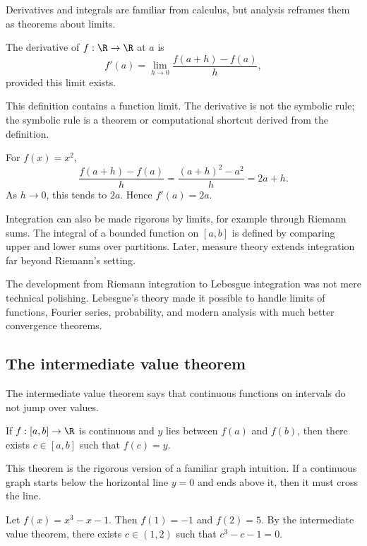 Derivatives and integrals are familiar from calculus, but analysis reframes
them as theorems about limits.

\begin{definition}
The derivative of $f:\R\to\R$ at $a$ is
\[
f'(a)=\lim_{h\to0}\frac{f(a+h)-f(a)}{h},
\]
provided this limit exists.
\end{definition}

This definition contains a function limit. The derivative is not the symbolic
rule; the symbolic rule is a theorem or computational shortcut derived from the
definition.

\begin{example}
For $f(x)=x^2$,
\[
\frac{f(a+h)-f(a)}{h}=\frac{(a+h)^2-a^2}{h}=2a+h.
\]
As $h\to0$, this tends to $2a$. Hence $f'(a)=2a$.
\end{example}

Integration can also be made rigorous by limits, for example through Riemann
sums. The integral of a bounded function on $[a,b]$ is defined by comparing
upper and lower sums over partitions. Later, measure theory extends integration
far beyond Riemann's setting.

\begin{historybox}
The development from Riemann integration to Lebesgue integration was not mere
technical polishing. Lebesgue's theory made it possible to handle limits of
functions, Fourier series, probability, and modern analysis with much better
convergence theorems.
\end{historybox}

\subsection{The intermediate value theorem}

The intermediate value theorem says that continuous functions on intervals do
not jump over values.

\begin{theorem}
If $f:[a,b]\to\R$ is continuous and $y$ lies between $f(a)$ and $f(b)$, then
there exists $c\in[a,b]$ such that $f(c)=y$.
\end{theorem}

This theorem is the rigorous version of a familiar graph intuition. If a
continuous graph starts below the horizontal line $y=0$ and ends above it, then
it must cross the line.

\begin{example}
Let $f(x)=x^3-x-1$. Then $f(1)=-1$ and $f(2)=5$. By the intermediate value
theorem, there exists $c\in(1,2)$ such that $c^3-c-1=0$.
\end{example}

